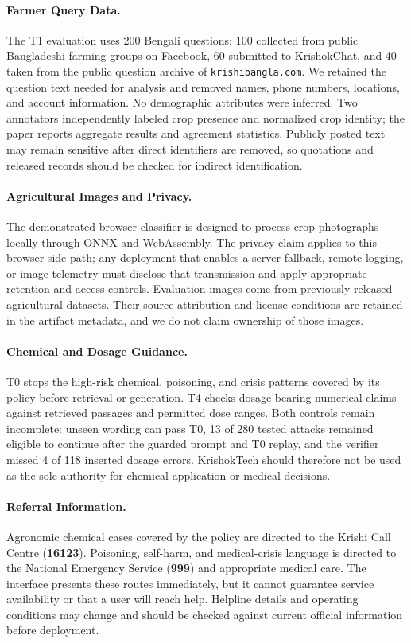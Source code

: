 \documentclass[11pt,a4paper]{article}
\begin{document}
\paragraph{Farmer Query Data.}
The T1 evaluation uses 200 Bengali questions: 100 collected from public Bangladeshi farming groups on Facebook, 60 submitted to KrishokChat, and 40 taken from the public question archive of \texttt{krishibangla.com}. We retained the question text needed for analysis and removed names, phone numbers, locations, and account information. No demographic attributes were inferred. Two annotators independently labeled crop presence and normalized crop identity; the paper reports aggregate results and agreement statistics. Publicly posted text may remain sensitive after direct identifiers are removed, so quotations and released records should be checked for indirect identification.

\paragraph{Agricultural Images and Privacy.}
The demonstrated browser classifier is designed to process crop photographs locally through ONNX and WebAssembly. The privacy claim applies to this browser-side path; any deployment that enables a server fallback, remote logging, or image telemetry must disclose that transmission and apply appropriate retention and access controls. Evaluation images come from previously released agricultural datasets. Their source attribution and license conditions are retained in the artifact metadata, and we do not claim ownership of those images.

\paragraph{Chemical and Dosage Guidance.}
T0 stops the high-risk chemical, poisoning, and crisis patterns covered by its policy before retrieval or generation. T4 checks dosage-bearing numerical claims against retrieved passages and permitted dose ranges. Both controls remain incomplete: unseen wording can pass T0, 13 of 280 tested attacks remained eligible to continue after the guarded prompt and T0 replay, and the verifier missed 4 of 118 inserted dosage errors. KrishokTech should therefore not be used as the sole authority for chemical application or medical decisions.

\paragraph{Referral Information.}
Agronomic chemical cases covered by the policy are directed to the Krishi Call Centre (\textbf{16123}). Poisoning, self-harm, and medical-crisis language is directed to the National Emergency Service (\textbf{999}) and appropriate medical care. The interface presents these routes immediately, but it cannot guarantee service availability or that a user will reach help. Helpline details and operating conditions may change and should be checked against current official information before deployment.
\end{document}
